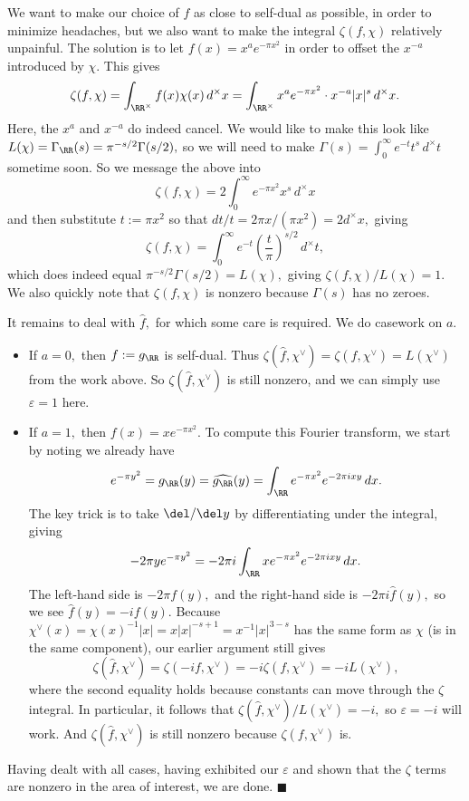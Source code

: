 We want to make our choice of $f$ as close to self-dual as possible, in order to minimize headaches, but we also want to make the integral $\zeta(f,\chi)$ relatively unpainful. The solution is to let $f(x)=x^ae^{-\pi x^2}$ in order to offset the $x^{-a}$ introduced by $\chi.$ This gives
\[\zeta(f,\chi)=\int_{\RR^\times}f(x)\chi(x)\,d^\times x=\int_{\RR^\times}x^ae^{-\pi x^2}\cdot x^{-a}|x|^s\,d^\times x.\]
Here, the $x^a$ and $x^{-a}$ do indeed cancel. We would like to make this look like $L(\chi)=\Gamma_\RR(s)=\pi^{-s/2}\Gamma(s/2),$ so we will need to make $\Gamma(s)=\int_0^\infty e^{-t}t^s\,d^\times t$ sometime soon. So we message the above into
\[\zeta(f,\chi)=2\int_0^\infty e^{-\pi x^2}x^s\,d^\times x\]
and then substitute $t:=\pi x^2$ so that $dt/t=2\pi x/\left(\pi x^2\right)=2d^\times x,$ giving
\[\zeta(f,\chi)=\int_0^\infty e^{-t}\left(\frac t\pi\right)^{s/2}\,d^\times t,\]
which does indeed equal $\pi^{-s/2}\Gamma(s/2)=L(\chi),$ giving $\zeta(f,\chi)/L(\chi)=1.$ We also quickly note that $\zeta(f,\chi)$ is nonzero because $\Gamma(s)$ has no zeroes.

It remains to deal with $\hat f,$ for which some care is required. We do casework on $a.$
\begin{itemize}
    \item If $a=0,$ then $f:=g_\RR$ is self-dual. Thus $\zeta(\hat f,\chi^\vee)=\zeta(f,\chi^\vee)=L(\chi^\vee)$ from the work above. So $\zeta(\hat f,\chi^\vee)$ is still nonzero, and we can simply use $\varepsilon=1$ here.
    \item If $a=1,$ then $f(x)=xe^{-\pi x^2}.$ To compute this Fourier transform, we start by noting we already have
    \[e^{-\pi y^2}=g_\RR(y)=\widehat{g_\RR}(y)=\int_\RR e^{-\pi x^2}e^{-2\pi ixy}\,dx.\]
    The key trick is to take $\del/\del y$ by differentiating under the integral, giving
    \[-2\pi ye^{-\pi y^2}=-2\pi i\int_\RR xe^{-\pi x^2}e^{-2\pi ixy}\,dx.\]
    The left-hand side is $-2\pi f(y),$ and the right-hand side is $-2\pi i\hat f(y),$ so we see $\hat f(y)=-if(y).$ Because $\chi^\vee(x)=\chi(x)^{-1}|x|=x|x|^{-s+1}=x^{-1}|x|^{3-s}$ has the same form as $\chi$ (is in the same component), our earlier argument still gives
    \[\zeta(\hat f,\chi^\vee)=\zeta(-if,\chi^\vee)=-i\zeta(f,\chi^\vee)=-iL(\chi^\vee),\]
    where the second equality holds because constants can move through the $\zeta$ integral. In particular, it follows that $\zeta(\hat f,\chi^\vee)/L(\chi^\vee)=-i,$ so $\varepsilon=-i$ will work. And $\zeta(\hat f,\chi^\vee)$ is still nonzero because $\zeta(f,\chi^\vee)$ is.
\end{itemize}
Having dealt with all cases, having exhibited our $\varepsilon$ and shown that the $\zeta$ terms are nonzero in the area of interest, we are done. $\blacksquare$

